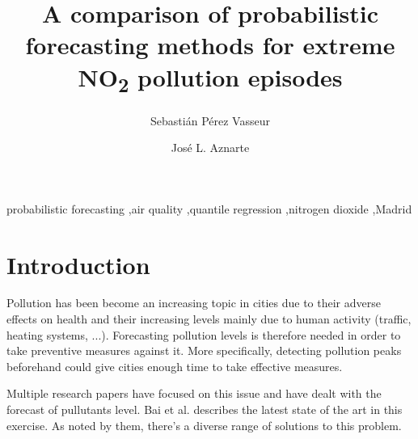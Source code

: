 \documentclass[a4paper,twocolumn,5p]{elsarticle}
\begin{document}
\newcommand{\no}{NO\textsubscript{2}\xspace}

\begin{frontmatter}

\title{A comparison of probabilistic forecasting methods for extreme \no pollution episodes}

\author{Sebasti\'an P\'erez Vasseur} 
\address{Artificial Intelligence Department\\Universidad Nacional de
  Educaci\'on a Distancia --- UNED\\c/ Juan del Rosal, 16, Madrid, Spain}

\author{Jos\'e L. Aznarte}
\address{Artificial Intelligence Department\\Universidad Nacional de
  Educaci\'on a Distancia --- UNED\\c/ Juan del Rosal, 16, Madrid, Spain}



\begin{abstract}

\end{abstract}

\begin{keyword}
probabilistic forecasting \sep air quality \sep quantile regression
\sep nitrogen dioxide \sep Madrid
\end{keyword}

\end{frontmatter}


\section{Introduction}
\label{sec:intro}

Pollution has been become an increasing topic in cities due to their adverse 
effects on health and their increasing levels mainly due to human activity 
(traffic, heating systems, ...). Forecasting pollution levels is therefore needed 
in order to take preventive measures against it. More specifically, detecting pollution 
peaks beforehand could give cities enough time to take effective measures.

Multiple research papers have focused on this issue and have dealt with the
forecast of pullutants level. Bai et al. \cite{bai_air_2018} describes the latest 
state of the art in this exercise. As noted by them, there's a diverse range of 
solutions to this problem.
\end{document}
